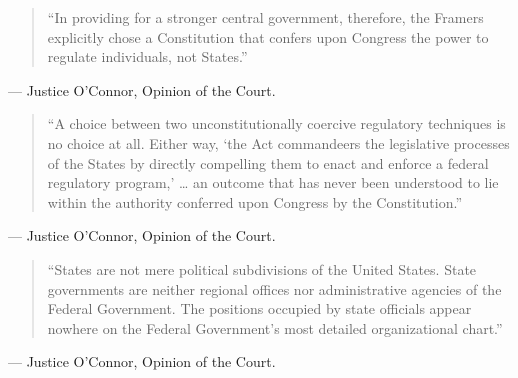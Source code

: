 \documentclass[12pt]{article}
\begin{document}
\begin{quote}
``In providing for a stronger central government, therefore, the Framers explicitly chose a Constitution that confers upon Congress the power to regulate individuals, not States.''
\end{quote}
\noindent --- Justice O'Connor, Opinion of the Court.

\begin{quote}
``A choice between two unconstitutionally coercive regulatory techniques is no choice at all. Either way, `the Act commandeers the legislative processes of the States by directly compelling them to enact and enforce a federal regulatory program,' \dots{} an outcome that has never been understood to lie within the authority conferred upon Congress by the Constitution.''
\end{quote}
\noindent --- Justice O'Connor, Opinion of the Court.

\begin{quote}
``States are not mere political subdivisions of the United States. State governments are neither regional offices nor administrative agencies of the Federal Government. The positions occupied by state officials appear nowhere on the Federal Government's most detailed organizational chart.''
\end{quote}
\noindent --- Justice O'Connor, Opinion of the Court.
\end{document}
